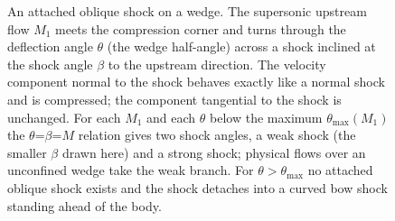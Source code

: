 \begin{figure}[htbp]
\centering
{}
\caption[Oblique-shock geometry on a wedge]{An attached oblique shock
on a wedge. The supersonic upstream flow $M_1$ meets the compression
corner and turns through the deflection angle $\theta$ (the wedge
half-angle) across a shock inclined at the shock angle $\beta$ to the
upstream direction. The velocity component normal to the shock
behaves exactly like a normal shock and is compressed; the component
tangential to the shock is unchanged. For each $M_1$ and each
$\theta$ below the maximum $\theta_{\max}(M_1)$ the
$\theta$=$\beta$=$M$ relation gives two shock angles, a weak shock
(the smaller $\beta$ drawn here) and a strong shock; physical flows
over an unconfined wedge take the weak branch. For $\theta>
\theta_{\max}$ no attached oblique shock exists and the shock detaches
into a curved bow shock standing ahead of the body.}
\label{fig:vol03ch13:oblique-shock}
\end{figure}
